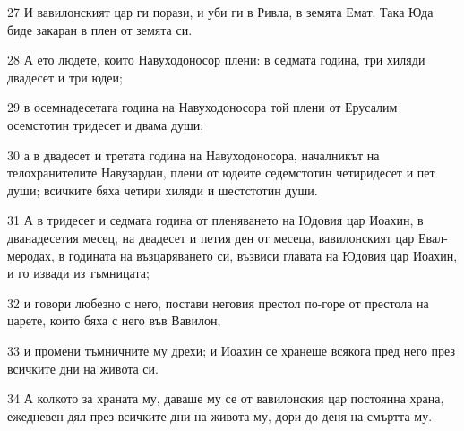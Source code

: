 \par 27 И вавилонският цар ги порази, и уби ги в Ривла, в земята Емат. Така Юда биде закаран в плен от земята си.
\par 28 А ето людете, които Навуходоносор плени: в седмата година, три хиляди двадесет и три юдеи;
\par 29 в осемнадесетата година на Навуходоносора той плени от Ерусалим осемстотин тридесет и двама души;
\par 30 а в двадесет и третата година на Навуходоносора, началникът на телохранителите Навузардан, плени от юдеите седемстотин четиридесет и пет души; всичките бяха четири хиляди и шестстотин души.
\par 31 А в тридесет и седмата година от пленяването на Юдовия цар Иоахин, в дванадесетия месец, на двадесет и петия ден от месеца, вавилонският цар Евал-меродах, в годината на възцаряването си, възвиси главата на Юдовия цар Иоахин, и го извади из тъмницата;
\par 32 и говори любезно с него, постави неговия престол по-горе от престола на царете, които бяха с него във Вавилон,
\par 33 и промени тъмничните му дрехи; и Иоахин се хранеше всякога пред него през всичките дни на живота си.
\par 34 А колкото за храната му, даваше му се от вавилонския цар постоянна храна, ежедневен дял през всичките дни на живота му, дори до деня на смъртта му.

